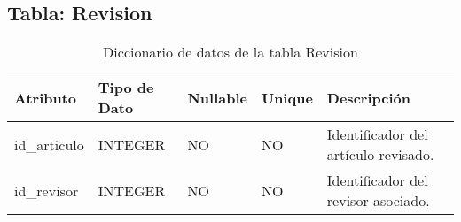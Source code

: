 \documentclass{article}
\begin{document}
\subsection{Tabla: Revision}
\begin{table}[H]
\centering
\begin{tabular}{|l|l|l|l|p{6cm}|}
\hline
\textbf{Atributo} & \textbf{Tipo de Dato} & \textbf{Nullable} & \textbf{Unique} & \textbf{Descripción} \\ \hline
id\_articulo & INTEGER & NO & NO & Identificador del artículo revisado. \\ \hline
id\_revisor & INTEGER & NO & NO & Identificador del revisor asociado. \\ \hline
\end{tabular}
\caption{Diccionario de datos de la tabla Revision}
\label{tab:revision}
\end{table}
\end{document}
